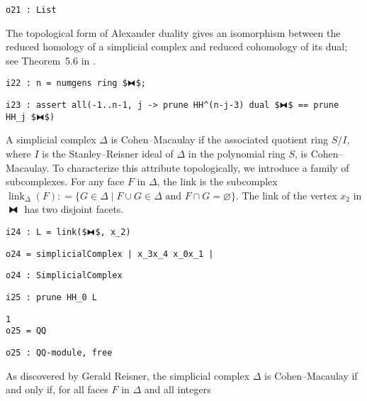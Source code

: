 \documentclass[12pt,leqno]{amsart}
\theoremstyle{definition}
\newcommand{\colequal}{\ensuremath{:\!=}}
\begin{document}
\begin{lstlisting}[xleftmargin=10pt, aboveskip=1pt, belowskip=3pt]
o21 : List
\end{lstlisting}
The topological form of Alexander duality gives an isomorphism
between the reduced homology of a simplicial complex and reduced cohomology of
its dual; see Theorem~5.6 in \cite{MS}.
\begin{lstlisting}[xleftmargin=10pt, aboveskip=3pt, belowskip=1.5pt]
i22 : n = numgens ring $⧓$;
\end{lstlisting}
\begin{lstlisting}[xleftmargin=10pt, aboveskip=1pt, belowskip=3pt]
i23 : assert all(-1..n-1, j -> prune HH^(n-j-3) dual $⧓$ == prune HH_j $⧓$)
\end{lstlisting}

A simplicial complex $\Delta$ is Cohen--Macaulay if the associated quotient
ring $S/I$, where $I$ is the Stanley--Reisner ideal of $\Delta$ in the
polynomial ring $S$, is Cohen--Macaulay.  To characterize this attribute
topologically, we introduce a family of subcomplexes.  For any face $F$ in
$\Delta$, the link is the subcomplex
$\operatorname{link}_\Delta(F) \colequal \{ G \in \Delta \mathrel{|}
\text{$F \cup G \in \Delta$ and $F \cap G = \varnothing$} \}$.  The link of
the vertex $x_2$ in $⧓$ has two disjoint facets.
\begin{lstlisting}[xleftmargin=10pt, aboveskip=3.0pt, belowskip=1.5pt]
i24 : L = link($⧓$, x_2)
\end{lstlisting}
\begin{lstlisting}[xleftmargin=10pt, aboveskip=1.5pt, belowskip=1.5pt]
o24 = simplicialComplex | x_3x_4 x_0x_1 |
\end{lstlisting}
\begin{lstlisting}[xleftmargin=10pt, aboveskip=1.5pt, belowskip=1.5pt]
o24 : SimplicialComplex
\end{lstlisting}
\begin{lstlisting}[xleftmargin=10pt, aboveskip=1.5pt, belowskip=1.5pt]
i25 : prune HH_0 L
\end{lstlisting}
\begin{lstlisting}[xleftmargin=10pt, lineskip=-10pt, aboveskip=4pt, belowskip=1pt]
        1
o25 = QQ
\end{lstlisting}
\begin{lstlisting}[xleftmargin=10pt, aboveskip=1.5pt, belowskip=3.0pt]
o25 : QQ-module, free
\end{lstlisting}
As discovered by Gerald Reisner, the simplicial complex $\Delta$ is
Cohen--Macaulay if and only if, for all faces $F$ in $\Delta$ and all integers
\end{document}
